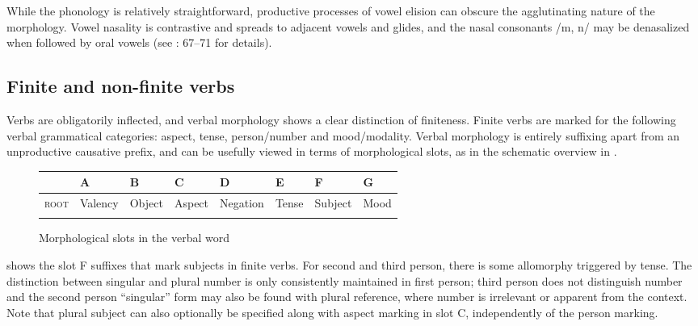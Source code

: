 \documentclass[output=paper]{langscibook}
\begin{document}
While the phonology is relatively straightforward, productive processes of vowel elision can obscure the agglutinating nature of the morphology. Vowel nasality is contrastive and spreads to adjacent vowels and glides, and the nasal consonants /m, n/ may be denasalized when followed by oral vowels (see \citealt{Overall2017}: 67–71 for details).

\subsection{Finite and non-finite verbs} %
\label{sec:overall:2.1}

Verbs are obligatorily inflected, and verbal morphology shows a clear distinction of finiteness. Finite verbs are marked for the following verbal grammatical categories: aspect, tense, person/number and mood/modality. Verbal morphology is entirely suffixing apart from an unproductive causative prefix, and can be usefully viewed in terms of morphological slots, as in the schematic overview in .


\begin{figure}
\begin{tabularx}{\textwidth}{XXXXXXXX}
\lsptoprule
& A & B & C & D & E & F & G\\
\hline
\textsc{root} & Valency & Object & Aspect & Negation & Tense & Subject & Mood\\
\lspbottomrule
\end{tabularx}
\caption{Morphological slots in the verbal word}
\label{fig:overall:1}
\end{figure}

 shows the slot F suffixes that mark subjects in finite verbs. For second and third person, there is some allomorphy triggered by tense. The distinction between singular and plural number is only consistently maintained in first person; third person does not distinguish number and the second person “singular” form may also be found with plural reference, where number is irrelevant or apparent from the context. Note that plural subject can also optionally be specified along with aspect marking in slot C, independently of the person marking.
\end{document}
